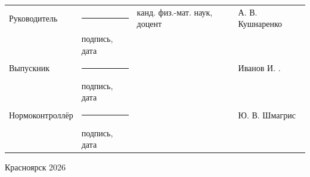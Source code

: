 \begin{titlepage}
\noindent
\begin{tabular}{@{} p{} >{\centering\arraybackslash} p{} p{} p{} @{}}
	Руководитель     & \rule{3.5cm}{.1pt}          & канд. физ.-мат. наук, доцент & А. В. Кушнаренко \\[-1ex]
	& {\scriptsize подпись, дата} &                   &                  \\[2ex]
	Выпускник        & \rule{3.5cm}{.1pt}          &                   & Иванов И. . \\[-1ex]
	& {\scriptsize подпись, дата} &                   &                  \\[2ex]
	Нормоконтроллёр  & \rule{3.5cm}{.1pt}          &                   & Ю. В. Шмагрис \\[-1ex]
	& {\scriptsize подпись, дата} &                   &                  \\
\end{tabular}

\vfill
\begin{center}Красноярск 2026\end{center}
\end{titlepage}
\restoregeometry